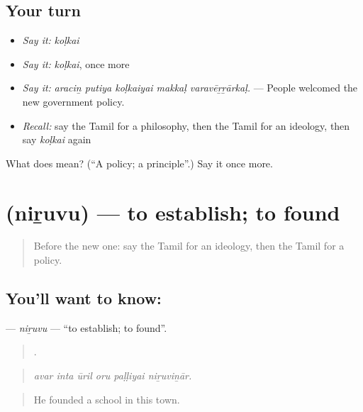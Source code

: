 \subsection*{Your turn}
\begin{itemize}
\raggedright
  \item \emph{Say it:} \emph{koḷkai}
  \item \emph{Say it:} \emph{koḷkai}, once more
  \item \emph{Say it:} \emph{araciṉ putiya koḷkaiyai makkaḷ varavēṟṟārkaḷ.} — People welcomed the new government policy.
  \item \emph{Recall:} say the Tamil for a philosophy, then the Tamil for an ideology, then say \emph{koḷkai} again
\end{itemize}

\begin{tcolorbox}[breakable,colback=teal!4,colframe=teal!35!black,title={Before you move on}]
What does  mean? (\textquotedblleft{}A policy; a principle\textquotedblright{}.) Say it once more.
\end{tcolorbox}
\section[\texorpdfstring{\ta{நிறுவு} (niṟuvu)}{நிறுவு (niṟuvu)}]{ (niṟuvu) — to establish; to found}

\label{lesson:TA-C358-niruvu}



\begin{quote}
Before the new one: say the Tamil for an ideology, then the Tamil for a policy.
\end{quote}

\subsection*{You'll want to know: }
\textbf{} — \emph{niṟuvu} — \textquotedblleft{}to establish; to found\textquotedblright{}.

\begin{quote}
     .
\end{quote}

\begin{quote}
\emph{avar inta ūril oru paḷḷiyai niṟuviṉār.}
\end{quote}

\begin{quote}
He founded a school in this town.
\end{quote}

